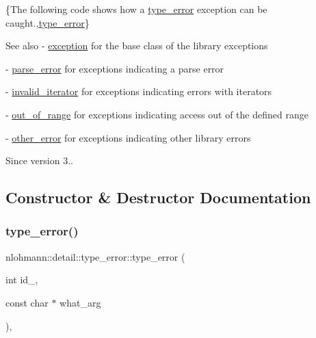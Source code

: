 \{The following code shows how a {\ttfamily \hyperlink{classnlohmann_1_1detail_1_1type__error}{type\+\_\+error}} exception can be caught.,\hyperlink{classnlohmann_1_1detail_1_1type__error}{type\+\_\+error}\}

\begin{DoxySeeAlso}{See also}
-\/ \hyperlink{classnlohmann_1_1detail_1_1exception}{exception} for the base class of the library exceptions 

-\/ \hyperlink{classnlohmann_1_1detail_1_1parse__error}{parse\+\_\+error} for exceptions indicating a parse error 

-\/ \hyperlink{classnlohmann_1_1detail_1_1invalid__iterator}{invalid\+\_\+iterator} for exceptions indicating errors with iterators 

-\/ \hyperlink{classnlohmann_1_1detail_1_1out__of__range}{out\+\_\+of\+\_\+range} for exceptions indicating access out of the defined range 

-\/ \hyperlink{classnlohmann_1_1detail_1_1other__error}{other\+\_\+error} for exceptions indicating other library errors
\end{DoxySeeAlso}
\begin{DoxySince}{Since}
version 3.. 
\end{DoxySince}


\subsection{Constructor \& Destructor Documentation}
\mbox{\label{classnlohmann_1_1detail_1_1type__error_aa01edaa0bf18b853368f0b900e485cd7}} 
\subsubsection{\texorpdfstring{type\+\_\+error()}{type\_error()}}
{\footnotesize\ttfamily nlohmann\+::detail\+::type\+\_\+error\+::type\+\_\+error (\begin{DoxyParamCaption}\item[{int}]{id\+\_\+,  }\item[{const char $\ast$}]{what\+\_\+arg }\end{DoxyParamCaption})\hspace{0.3cm}{\ttfamily [inline]}, {\ttfamily [private]}}




